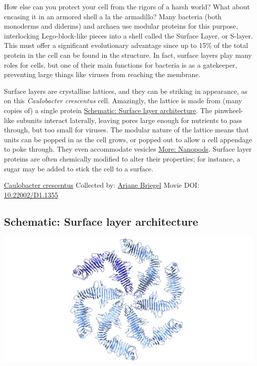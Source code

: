 \documentclass[]{tufte-book}
\begin{document}
How else can you protect your cell from the rigors of a harsh world? What about encasing it in an armored shell a la the armadillo? Many bacteria (both monoderms and diderms) and archaea use modular proteins for this purpose, interlocking Lego-block-like pieces into a shell called the Surface Layer, or S-layer. This must offer a significant evolutionary advantage since up to 15\% of the total protein in the cell can be found in the structure. In fact, surface layers play many roles for cells, but one of their main functions for bacteria is as a gatekeeper, preventing large things like viruses from reaching the membrane.

Surface layers are crystalline lattices, and they can be striking in appearance, as on this \emph{Caulobacter crescentus} cell. Amazingly, the lattice is made from (many copies of) a single protein \protect\hyperlink{Surface_layer_architecture}{Schematic: Surface layer architecture}. The pinwheel-like subunits interact laterally, leaving pores large enough for nutrients to pass through, but too small for viruses. The modular nature of the lattice means that units can be popped in as the cell grows, or popped out to allow a cell appendage to poke through. They even accommodate vesicles \protect\hyperlink{Nanopods}{More: Nanopods}. Surface layer proteins are often chemically modified to alter their properties; for instance, a sugar may be added to stick the cell to a surface.



\hypertarget{htmlwidget-6972da963bf6a6a2a56a}{}

\label{fig:2-6}\protect\hyperlink{tree}{Caulobacter crescentus} Collected by: \protect\hyperlink{ariane_briegel}{Ariane Briegel} Movie DOI: \href{https://doi.org/10.22002/D1.1355}{10.22002/D1.1355}

\hypertarget{Surface_layer_architecture}{%
\subsection*{Schematic: Surface layer architecture}\label{Surface_layer_architecture}}

\includegraphics{img/schematics/2_6_1}
\end{document}
